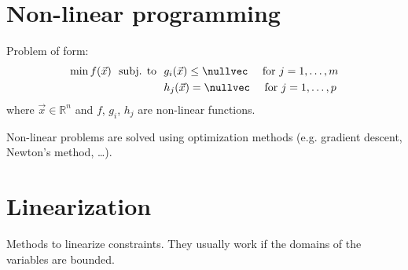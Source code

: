 \section{Non-linear programming}

Problem of form:
\[
    \begin{split}
        \min f(\vec{x}) \,\,\text{ subj. to }\,\,& g_i(\vec{x}) \leq \nullvec \hspace{1em}\text{ for $j=1, \dots, m$} \\
                                    & h_j(\vec{x}) = \nullvec \hspace{1em}\text{ for $j=1, \dots, p$}
    \end{split}
\]
where $\vec{x} \in \mathbb{R}^n$ and $f$, $g_i$, $h_j$ are non-linear functions.

\begin{remark}
    Non-linear problems are solved using optimization methods (e.g. gradient descent, Newton's method, \dots).
\end{remark}



\section{Linearization}

Methods to linearize constraints.
They usually work if the domains of the variables are bounded.

